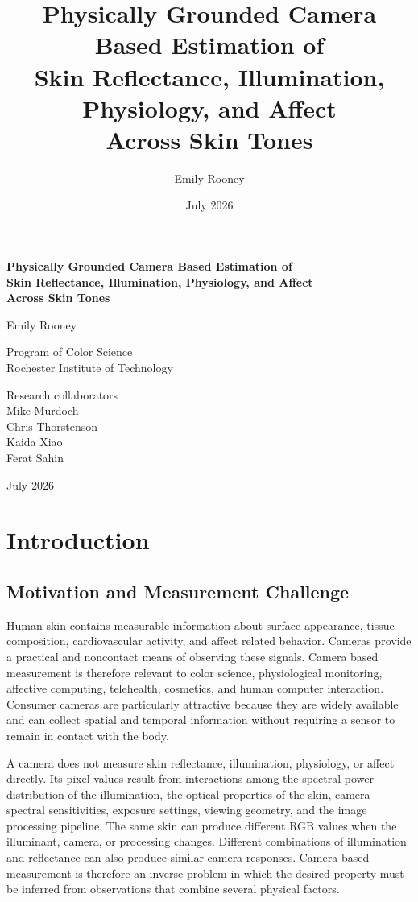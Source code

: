 \documentclass[12pt]{article}
\title{Physically Grounded Camera Based Estimation of\\
Skin Reflectance, Illumination, Physiology, and Affect\\
Across Skin Tones}
\author{Emily Rooney}
\date{July 2026}
\begin{document}
\begin{titlepage}
\centering
\vspace*{1in}

{\Large\bfseries
Physically Grounded Camera Based Estimation of\\
Skin Reflectance, Illumination, Physiology, and Affect\\
Across Skin Tones\par}

\vspace{1in}
{\large Emily Rooney\par}
\vspace{0.5in}

Program of Color Science\\
Rochester Institute of Technology

\vfill

Research collaborators\\
Mike Murdoch\\
Chris Thorstenson\\
Kaida Xiao\\
Ferat Sahin

\vfill
July 2026
\end{titlepage}

\tableofcontents
\clearpage
{}

\section{Introduction}

\subsection{Motivation and Measurement Challenge}

Human skin contains measurable information about surface appearance, tissue composition, cardiovascular activity, and affect related behavior. Cameras provide a practical and noncontact means of observing these signals. Camera based measurement is therefore relevant to color science, physiological monitoring, affective computing, telehealth, cosmetics, and human computer interaction. Consumer cameras are particularly attractive because they are widely available and can collect spatial and temporal information without requiring a sensor to remain in contact with the body.

A camera does not measure skin reflectance, illumination, physiology, or affect directly. Its pixel values result from interactions among the spectral power distribution of the illumination, the optical properties of the skin, camera spectral sensitivities, exposure settings, viewing geometry, and the image processing pipeline. The same skin can produce different RGB values when the illuminant, camera, or processing changes. Different combinations of illumination and reflectance can also produce similar camera responses. Camera based measurement is therefore an inverse problem in which the desired property must be inferred from observations that combine several physical factors.
\end{document}
